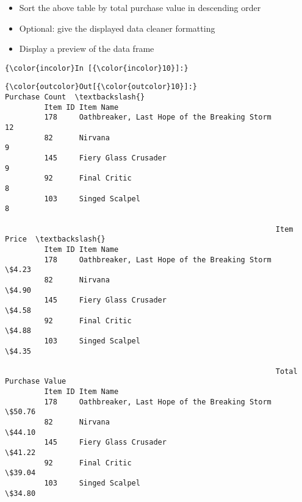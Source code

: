\documentclass[11pt]{article}
\begin{document}
    \begin{itemize}
\item
  Sort the above table by total purchase value in descending order
\item
  Optional: give the displayed data cleaner formatting
\item
  Display a preview of the data frame
\end{itemize}

    \begin{Verbatim}[commandchars=\\\{\}]
{\color{incolor}In [{\color{incolor}10}]:} 
\end{Verbatim}


\begin{Verbatim}[commandchars=\\\{\}]
{\color{outcolor}Out[{\color{outcolor}10}]:}                                                      Purchase Count  \textbackslash{}
         Item ID Item Name                                                     
         178     Oathbreaker, Last Hope of the Breaking Storm             12   
         82      Nirvana                                                   9   
         145     Fiery Glass Crusader                                      9   
         92      Final Critic                                              8   
         103     Singed Scalpel                                            8   
         
                                                              Item Price  \textbackslash{}
         Item ID Item Name                                                 
         178     Oathbreaker, Last Hope of the Breaking Storm      \$4.23   
         82      Nirvana                                           \$4.90   
         145     Fiery Glass Crusader                              \$4.58   
         92      Final Critic                                      \$4.88   
         103     Singed Scalpel                                    \$4.35   
         
                                                              Total Purchase Value  
         Item ID Item Name                                                          
         178     Oathbreaker, Last Hope of the Breaking Storm               \$50.76  
         82      Nirvana                                                    \$44.10  
         145     Fiery Glass Crusader                                       \$41.22  
         92      Final Critic                                               \$39.04  
         103     Singed Scalpel                                             \$34.80  
\end{Verbatim}
            

    
    
    
    
\end{document}
